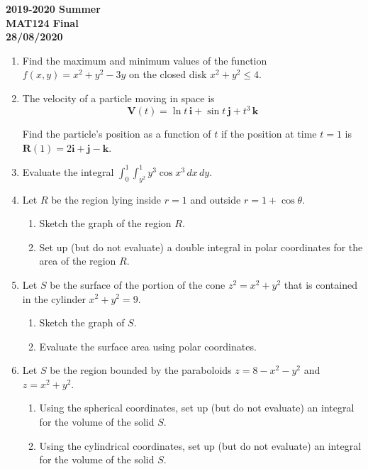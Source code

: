 \documentclass[a4paper, 12pt]{article}
\begin{document}
\newpage
{}
{}
\begin{center}
\textbf{2019-2020 Summer\\MAT124 Final\\28/08/2020}
\end{center}

\begin{enumerate}[leftmargin=*,label=\textbf{\arabic*.}]
\item Find the maximum and minimum values of the function $f(x,y)=x^2+y^2-3y$ on the closed disk $x^2+y^2\leq4$.

\item The velocity of a particle moving in space is
\[\mathbf{V}(t)=\ln t\,\mathbf{i} +\sin t\,\mathbf{j}+ t^3\,\mathbf{k}\]

Find the particle's position as a function of $t$ if the position at time $t=1$ is \linebreak $\mathbf{R}(1)=2\mathbf{i}+\mathbf{j}-\mathbf{k}$.
\item Evaluate the integral $\displaystyle \int_0^1\int_{y^2}^1 y^3\cos x^3\,dx\,dy$.

\item Let $R$ be the region lying inside $r=1$ and outside $r=1+\cos\theta$.

\begin{enumerate}[leftmargin=*,label=\textbf{\alph*.}]
\item Sketch the graph of the region $R$.
\item Set up (but do not evaluate) a double integral in polar coordinates for the area of the region $R$.
\end{enumerate}

\item Let $S$ be the surface of the portion of the cone $z^2=x^2+y^2$ that is contained in the cylinder $x^2+y^2=9$.

\begin{enumerate}[leftmargin=*,label=\textbf{\alph*.}]
\item Sketch the graph of $S$.
\item Evaluate the surface area using polar coordinates.
\end{enumerate}

\item Let $S$ be the region bounded by the paraboloids $z=8-x^2-y^2$ and $z=x^2+y^2$.

\begin{enumerate}[leftmargin=*,label=\textbf{\alph*.}]
\item Using the spherical coordinates, set up (but do not evaluate) an integral for the volume of the solid $S$.
\item Using the cylindrical coordinates, set up (but do not evaluate) an integral for the volume of the solid $S$.
\end{enumerate}
\end{enumerate}
\end{document}
